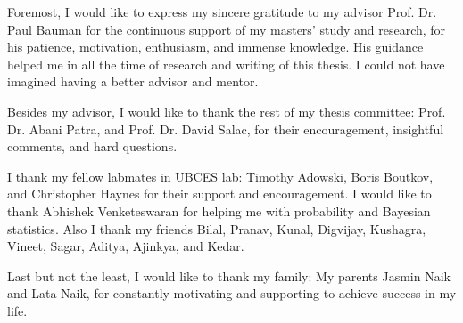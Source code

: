 \noindent Foremost, I would like to express my sincere gratitude to my advisor Prof. Dr. Paul Bauman for the continuous support of my masters' study and research, for his patience, motivation, enthusiasm, and immense knowledge. His guidance helped me in all the time of research and writing of this thesis. I could not have imagined having a better advisor and mentor.

\noindent Besides my advisor, I would like to thank the rest of my thesis committee: Prof. Dr. Abani Patra,  and Prof. Dr. David Salac, for their encouragement, insightful comments, and hard questions.



\noindent I thank my fellow labmates in UBCES lab: Timothy Adowski, Boris Boutkov, and Christopher Haynes for their support and encouragement. I would like to thank Abhishek Venketeswaran for helping me with probability and Bayesian statistics. Also I thank my friends Bilal, Pranav, Kunal, Digvijay, Kushagra, Vineet, Sagar, Aditya, Ajinkya, and Kedar.


\noindent Last but not the least, I would like to thank my family: My parents Jasmin Naik and Lata Naik, for constantly motivating and supporting to achieve success in my life. 